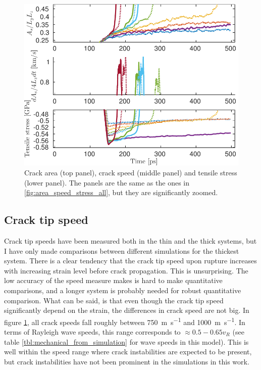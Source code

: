\begin{figure}
\centering
\includegraphics[width=12cm]{../figures/thesis/area_speed_stress_all_zoomed.pdf}
\caption{Crack area (top panel), crack speed (middle panel) and tensile stress (lower panel). The panels are the same as the ones in \ref{fig:area_speed_stress_all}, but they are significantly zoomed.}
\label{fig:area_speed_stress_zoom}
\end{figure}

\subsection{Crack tip speed}
Crack tip speeds have been measured both in the thin and the thick systems, but I have only made comparisons between different simulations for the thickest system. There is a clear tendency that the crack tip speed upon rupture increases with increasing strain level before crack propagation. This is unsurprising. The low accuracy of the speed measure makes is hard to make quantitative comparisons, and a longer system is probably needed for robust quantitative comparison. What can be said, is that even though the crack tip speed significantly depend on the strain, the differences in crack speed are not big. In figure \ref{fig:area_speed_stress_zoom}, all crack speeds fall roughly between \SI{750}{\meter\per\second} and \SI{1000}{\meter\per\second}. In terms of Rayleigh wave speeds, this range corresponds to $\approx 0.5 - 0.65 v_R$ (see table \ref{tbl:mechanical_from_simulation} for wave speeds in this model). This is well within the speed range where crack instabilities are expected to be present, but crack instabilities have not been prominent in the simulations in this work.
